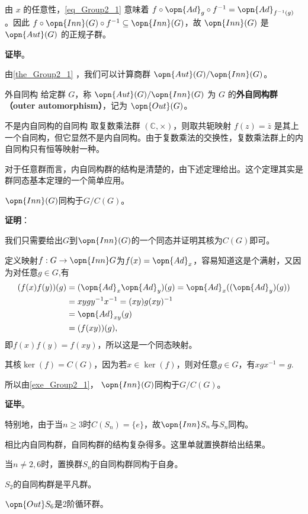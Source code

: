 由 $x$ 的任意性，\autoref{eq_Group2_1} 意味着 $f\circ \opn{Ad}_g\circ f^{-1}=\opn{Ad}_{f^{-1}(g)}$。因此 $f\circ\opn{Inn}(G)\circ f^{-1}\subseteq\opn{Inn}(G)$，故 $\opn{Inn}(G)$ 是 $\opn{Aut}(G)$ 的正规子群。

\textbf{证毕}。

由\autoref{the_Group2_1} ，我们可以计算商群 $\opn{Aut}(G)/\opn{Inn}(G)$。

\begin{definition}{外自同构}
给定群 $G$，称 $\opn{Aut}(G)/\opn{Inn}(G)$ 为 $G$ 的\textbf{外自同构群（outer automorphism）}，记为 $\opn{Out} (G)$。
\end{definition}

\begin{example}{不是内自同构的自同构}
取复数乘法群 $(\mathbb{C}, \times)$，则取共轭映射 $f(z)=\bar{z}$ 是其上一个自同构，但它显然不是内自同构。由于复数乘法的交换性，复数乘法群上的内自同构只有恒等映射一种。
\end{example}

对于任意群而言，内自同构群的结构是清楚的，由下述定理给出。这个定理其实是群同态基本定理的一个简单应用。

\begin{theorem}{}
$\opn{Inn}(G)$同构于$G/C(G)$。
\end{theorem}

\textbf{证明}：

我们只需要给出$G$到$\opn{Inn}(G)$的一个同态并证明其核为$C(G)$即可。

定义映射$f:G\to \opn{Inn} G$为$f(x)=\opn{Ad}_x$，容易知道这是个满射，又因为对任意$g\in G$,有
\begin{equation}
\begin{split}
(f(x)f(y))(g)&=(\opn{Ad}_x\opn{Ad}_y)(g)=\opn{Ad}_x((\opn{Ad}_y)(g))\\
&=xygy^{-1}x^{-1}=(xy)g(xy)^{-1}\\
&=\opn{Ad}_{xy}(g)\\
&=(f(xy))(g),
\end{split}
\end{equation}
即$f(x)f(y)=f(xy)$，所以这是一个同态映射。

其核$\ker(f)=C(G)$，因为若$x\in\ker(f)$，则对任意$g\in G$，有$xgx^{-1}=g$.

所以由\autoref{exe_Group2_1}， $\opn{Inn}(G)$同构于$G/C(G)$。

\textbf{证毕}。

特别地，由于当$n\geq 3$时$C(S_n)=\{e\}$，故$\opn{Inn} S_n$与$S_n$同构。

相比内自同构群，自同构群的结构复杂得多。这里单就置换群给出结果。

\begin{theorem}{}
当$n\neq 2,6$时，置换群$S_n$的自同构群同构于自身。

$S_2$的自同构群是平凡群。

$\opn{Out} S_6$是2阶循环群。
\end{theorem}
